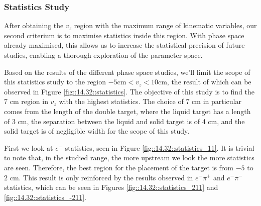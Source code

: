 \subsubsection{Statistics Study}
\label{14.32::statistics_study}
    After obtaining the $v_z$ region with the maximum range of kinematic variables, our second criterium is to maximise statistics inside this region.
    With phase space already maximised, this allows us to increase the statistical precision of future studies, enabling a thorough exploration of the parameter space.

    Based on the results of the different phase space studies, we'll limit the scope of this statistics study to the region $-5 \text{cm} < v_z < 10 \text{cm}$, the result of which can be observed in Figure \ref{fig::14.32::statistics}.
    The objective of this study is to find the 7 cm region in $v_z$ with the highest statistics.
    The choice of 7 cm in particular comes from the length of the double target, where the liquid target has a length of 3 cm, the separation between the liquid and solid target is of 4 cm, and the solid target is of negligible width for the scope of this study.

    First we look at $e^-$ statistics, seen in Figure \ref{fig::14.32::statistics_11}.
    It is trivial to note that, in the studied range, the more upstream we look the more statistics are seen.
    Therefore, the best region for the placement of the target is from $-5$ to $2$ cm.
    This result is only reinforced by the results observed in $e^-\pi^+$ and $e^-\pi^-$ statistics, which can be seen in Figures \ref{fig::14.32::statistics_211} and \ref{fig::14.32::statistics_-211}.

